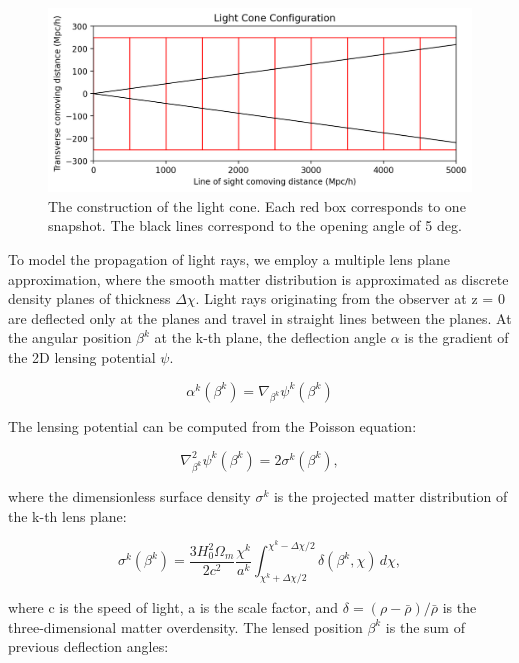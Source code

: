 \documentclass[fleqn,usenatbib]{mnras}
\begin{document}
\begin{figure}
    \centering
    \includegraphics[width=0.95\hsize]{img/config.png}
    \caption{The construction of the light cone. Each red box corresponds to one snapshot. 
    The black lines correspond to the opening angle of 5 deg.}
    \label{fig:config}
\end{figure}

To model the propagation of light rays, we employ a multiple lens plane approximation, 
where the smooth matter distribution is approximated as discrete density planes of thickness $\Delta \chi$.
Light rays originating from the observer at z = 0 are deflected only at the planes and travel in straight lines between the planes.
At the angular position  $\beta^k$  at the k-th plane, the deflection angle $\alpha$ is the gradient of the 2D lensing potential $\psi$.

\begin{equation}
    \alpha^k(\beta^k) = \nabla_{\beta^k} \psi^k(\beta^k)
\end{equation}

The lensing potential can be computed from the Poisson equation:

\begin{equation}
    \nabla^2_{\beta^k} \psi^k(\beta^k) = 2 \sigma^k(\beta^k),
\end{equation}

where the dimensionless surface density $\sigma^k$ is the projected matter distribution of the k-th lens plane:

\begin{equation}
    \sigma^k(\beta^k) = \frac{3 H^2_0 \Omega_m}{2 c^2} \frac{\chi^k}{a^k} \int_{\chi^k + \Delta \chi/2}^{\chi^k - \Delta \chi/2} \delta(\beta^k, \chi) \, d\chi,
\end{equation}

where c is the speed of light, a is the scale factor, and $\delta = \left(\rho - \bar{\rho} \right) /\bar{\rho}$ is the three-dimensional matter overdensity. 
The lensed position $\beta^k$ is the sum of previous deflection angles:
\end{document}
